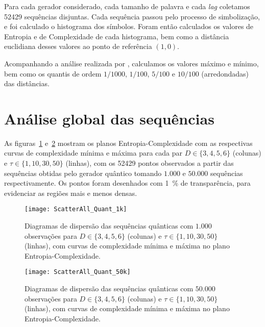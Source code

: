 

\begin{center}
\end{center}

Para cada gerador considerado, cada tamanho de palavra e cada \textit{lag} coletamos \num{52429} sequências disjuntas.
Cada sequência passou pelo processo de simbolização, e foi calculado o histograma dos símbolos.
Foram então calculados os valores de Entropia e de Complexidade de cada histograma, bem como a distância euclidiana desses valores ao ponto de referência $(1,0)$.

Acompanhando a análise realizada por \citet{NewPermutationEntropy}, calculamos os valores máximo e mínimo, bem como os quantis de ordem $1/1000$, $1/100$, $5/100$ e $10/100$ (arredondadas) das distâncias.

\section{Análise global das sequências}

As figuras~\ref{Fig:ScatterAll_Quant_1k} e~\ref{Fig:ScatterAll_Quant_50k} mostram os planos Entropia-Complexidade com as respectivas curvas de complexidade mínima e máxima para cada par $D\in\{3,4,5,6\}$ (colunas) e $\tau\in\{1,10,30,50\}$ (linhas), com os \num{52429} pontos observados a partir das sequências obtidas pelo gerador quântico tomando $1.000$ e $50.000$ sequências respectivamente.
Os pontos foram desenhados com \SI{1}{\percent} de transparência, para evidenciar as regiões mais e menos densas.

\begin{figure}[hbt]
	\centering
	\texttt{[image: ScatterAll\_Quant\_1k]}
	\caption{Diagramas de dispersão das sequências quânticas com $1.000$ observações para $D\in\{3,4,5,6\}$ (colunas) e $\tau\in\{1,10,30,50\}$ (linhas), com curvas de complexidade mínima e máxima no plano Entropia-Complexidade.}\label{Fig:ScatterAll_Quant_1k}
\end{figure}

\begin{figure}[hbt]
	\centering
	\texttt{[image: ScatterAll\_Quant\_50k]}
	\caption{Diagramas de dispersão das sequências quânticas com $50.000$ observações para $D\in\{3,4,5,6\}$ (colunas) e $\tau\in\{1,10,30,50\}$ (linhas), com curvas de complexidade mínima e máxima no plano Entropia-Complexidade.}\label{Fig:ScatterAll_Quant_50k}
\end{figure}

